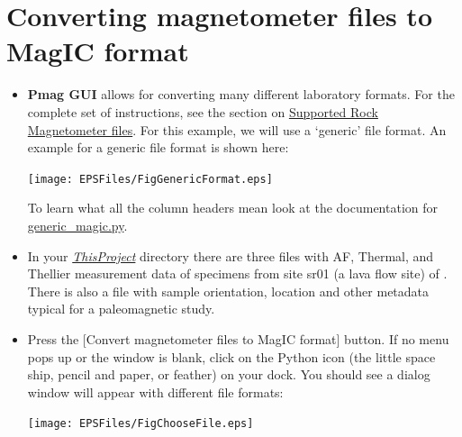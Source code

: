 \documentclass[11pt]{book}
\begin{document}
{ 

\section{Converting magnetometer files to MagIC format}
\begin{itemize}
\item {\bf Pmag GUI} allows for converting many different laboratory formats.  For the complete set of instructions, see the section on \href{#magnetometer_files}{Supported Rock Magnetometer files}.   For this example, we will use a `generic' file format.
An example for a generic file format is shown here:

\texttt{[image: EPSFiles/FigGenericFormat.eps]}

To learn what all the column headers mean look at the documentation for \href{#generic_magic.py}{generic\_magic.py}.

%


\item In your  \href{#Project_Directory}{\it ThisProject} directory  there are three files with AF, Thermal, and Thellier measurement data of specimens from site sr01 (a lava flow site) of \cite{tauxe04b}.  There is also a file with sample orientation, location and other metadata typical for a paleomagnetic study.
\item Press the [Convert magnetometer files to MagIC format] button. If no menu pops up or the window is blank, click on the Python icon  (the little space ship, pencil and paper, or feather) on your dock. You should see a dialog window will appear with different file formats:

\texttt{[image: EPSFiles/FigChooseFile.eps]}


\end{itemize}}
\end{document}
